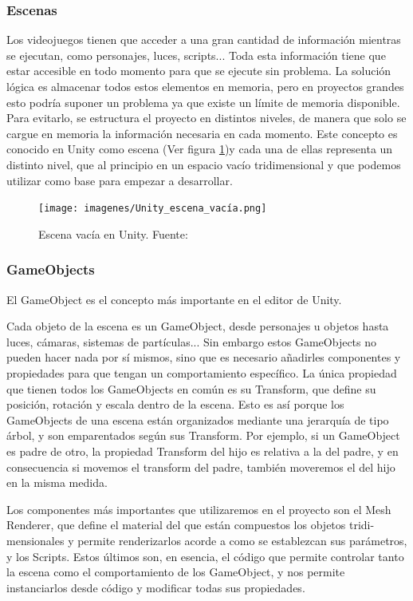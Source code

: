 \documentclass[../main.tex]{subfiles}
\begin{document}
\subsubsection{Escenas}

Los videojuegos tienen que acceder a una gran cantidad de información mientras se ejecutan, como personajes, luces, scripts... Toda esta información tiene que estar accesible en todo momento para que se ejecute sin problema. La solución lógica es almacenar todos estos elementos en memoria, pero en proyectos grandes esto podría suponer un problema ya que existe un límite de memoria disponible. Para evitarlo, se estructura el proyecto en distintos niveles, de manera que solo se cargue en memoria la información necesaria en cada momento. Este concepto es conocido en Unity como escena (Ver figura \ref{fig:Escena_Vacía})y cada una de ellas representa un distinto nivel, que al principio en un espacio vacío tridimensional y que podemos utilizar como base para empezar a desarrollar.

\begin{figure}[h!]
\centering
\texttt{[image: imagenes/Unity\_escena\_vacía.png]}
\caption{Escena vacía en Unity. Fuente:\cite{Scene_Documentation}}
\label{fig:Escena_Vacía}
\end{figure}

\subsubsection{GameObjects}

El GameObject es el concepto más importante en el editor de Unity.

Cada objeto de la escena es un GameObject, desde personajes u objetos hasta luces, cámaras, sistemas de partículas... Sin embargo estos GameObjects no pueden hacer nada por sí mismos, sino que es necesario añadirles componentes y propiedades para que tengan un comportamiento específico. La única propiedad que tienen todos los GameObjects en común es su Transform, que define su posición, rotación y escala dentro de la escena. Esto es así porque los GameObjects de una escena están organizados mediante una jerarquía de tipo árbol, y son emparentados según sus Transform. Por ejemplo, si un GameObject es padre de otro, la propiedad Transform del hijo es relativa a la del padre, y en consecuencia si movemos el transform del padre, también moveremos el del hijo en la misma medida.

Los componentes más importantes que utilizaremos en el proyecto son el Mesh Renderer, que define el material del que están compuestos los objetos tridi- mensionales y permite renderizarlos acorde a como se establezcan sus parámetros, y los Scripts. Estos últimos son, en esencia, el código que permite controlar tanto la escena como el comportamiento de los GameObject, y nos permite instanciarlos desde código y modificar todas sus propiedades.
\end{document}
